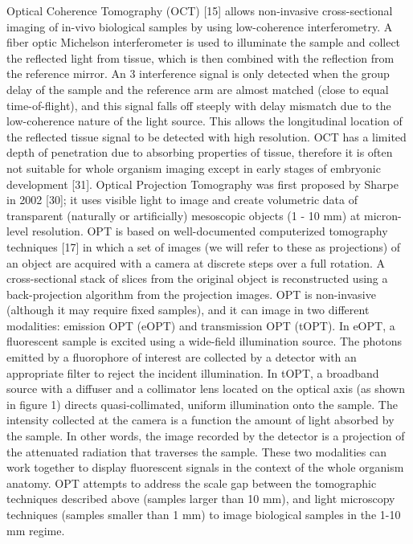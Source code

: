 Optical Coherence Tomography (OCT) [15] allows non-invasive cross-sectional imaging of in-vivo biological samples by using low-coherence interferometry.
A fiber optic Michelson interferometer is used to illuminate the sample and collect the reflected light from tissue, which is then combined with the reflection from the reference mirror.
An 3 interference signal is only detected when the group delay of the sample and the reference arm are almost matched (close to equal time-of-flight), and this signal falls off steeply with delay mismatch due to the low-coherence nature of the light source.
This allows the longitudinal location of the reflected tissue signal to be detected with high resolution.
OCT has a limited depth of penetration due to absorbing properties of tissue, therefore it is often not suitable for whole organism imaging except in early stages of embryonic development [31].
Optical Projection Tomography was first proposed by Sharpe in 2002 [30]; it uses visible light to image and create volumetric data of transparent (naturally or artificially) mesoscopic objects (1 - 10 mm) at micron-level resolution.
OPT is based on well-documented computerized tomography techniques [17] in which a set of images (we will refer to these as projections) of an object are acquired with a camera at discrete steps over a full rotation.
A cross-sectional stack of slices from the original object is reconstructed using a back-projection algorithm from the projection images.
OPT is non-invasive (although it may require fixed samples), and it can image in two different modalities: emission OPT (eOPT) and transmission OPT (tOPT).
In eOPT, a fluorescent sample is excited using a wide-field illumination source.
The photons emitted by a fluorophore of interest are collected by a detector with an appropriate filter to reject the incident illumination.
In tOPT, a broadband source with a diffuser and a collimator lens located on the optical axis (as shown in figure 1) directs quasi-collimated, uniform illumination onto the sample.
The intensity collected at the camera is a function the amount of light absorbed by the sample.
In other words, the image recorded by the detector is a projection of the attenuated radiation that traverses the sample.
These two modalities can work together to display fluorescent signals in the context of the whole organism anatomy.
OPT attempts to address the scale gap between the tomographic techniques described above (samples larger than 10 mm), and light microscopy techniques (samples smaller than 1 mm) to image biological samples in the 1-10 mm regime.


